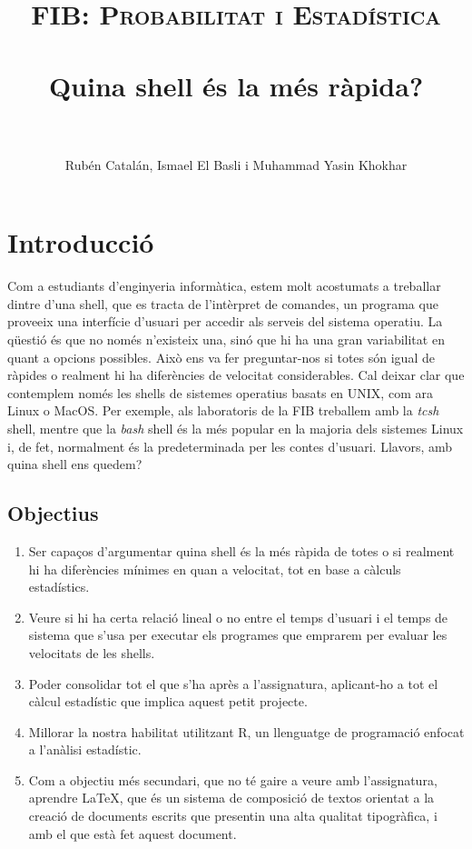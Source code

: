 \documentclass[12pt]{article}
\title{
  \normalfont \normalsize 
  \textsc{FIB: Probabilitat i Estadística} \\ [25pt] 
  \horrule{0.5pt} \\[0.4cm] %
  \huge Quina shell és la més ràpida? \\ %
  \horrule{2pt} \\[0.5cm] %
}
\author{Rubén Catalán, Ismael El Basli i Muhammad Yasin Khokhar}
\begin{document}
\maketitle %
\newpage
\section{Introducció}
Com a estudiants d'enginyeria informàtica, estem molt acostumats a treballar dintre d'una shell,
que es tracta de l'intèrpret de comandes, un programa que proveeix una interfície d'usuari
per accedir als serveis del sistema operatiu. La qüestió és que no només n'existeix una, sinó
que hi ha una gran variabilitat en quant a opcions possibles. Això ens va fer preguntar-nos si 
totes són igual de ràpides o realment hi ha diferències de velocitat considerables. Cal deixar clar
que contemplem només les shells de sistemes operatius basats en UNIX, com ara Linux o MacOS. Per exemple,
als laboratoris de la FIB treballem amb la \textit{tcsh} shell, mentre que la \textit{bash} shell és 
la més popular en la majoria dels sistemes Linux i, de fet, normalment és la predeterminada per 
les contes d'usuari. Llavors, amb quina shell ens quedem?


\subsection{Objectius}
\begin{enumerate}
  \item Ser capaços d'argumentar quina shell és la més ràpida de totes o si realment hi ha diferències 
    mínimes en quan a velocitat, tot en base a càlculs estadístics.
  \item Veure si hi ha certa relació lineal o no entre el temps d'usuari i el temps de sistema que s'usa
    per executar els programes que emprarem per evaluar les velocitats de les shells.
  \item Poder consolidar tot el que s'ha après a l'assignatura, aplicant-ho a tot el càlcul estadístic
    que implica aquest petit projecte.
  \item Millorar la nostra habilitat utilitzant R, un llenguatge de programació enfocat a l'anàlisi
    estadístic.
  \item Com a objectiu més secundari, que no té gaire a veure amb l'assignatura, aprendre \LaTeX, que 
    és un sistema de composició de textos orientat a la creació de documents escrits que presentin una
    alta qualitat tipogràfica, i amb el que està fet aquest document.

\end{enumerate}
\end{document}

